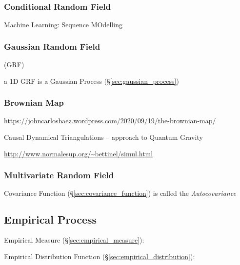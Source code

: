 \subsubsection{Conditional Random Field}\label{sec:conditional_random_field}

Machine Learning: Sequence MOdelling



\subsubsection{Gaussian Random Field}\label{sec:gaussian_random_field}

(GRF)

a 1D GRF is a Gaussian Process (\S\ref{sec:gaussian_process})



\subsubsection{Brownian Map}\label{sec:brownian_map}

\url{https://johncarlosbaez.wordpress.com/2020/09/19/the-brownian-map/}

Causal Dynamical Triangulations -- approach to Quantum Gravity

\url{http://www.normalesup.org/~bettinel/simul.html}



\subsubsection{Multivariate Random Field}\label{sec:multivariate_random_field}


Covariance Function (\S\ref{sec:covariance_function}) is called the
\emph{Autocovariance}



\subsection{Empirical Process}\label{sec:empirical_process}

Empirical Measure (\S\ref{sec:empirical_measure}):

Empirical Distribution Function (\S\ref{sec:empirical_distribution}):

